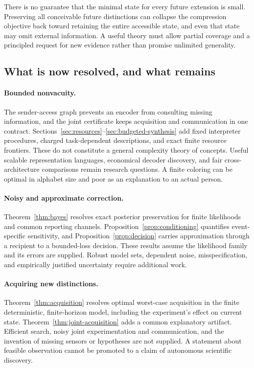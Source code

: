 \documentclass[11pt,letterpaper]{article}
\theoremstyle{plain}
\theoremstyle{definition}
\begin{document}
There is no guarantee that the minimal state for every future extension is small. Preserving all conceivable future distinctions can collapse the compression objective back toward retaining the entire accessible state, and even that state may omit external information. A useful theory must allow partial coverage and a principled request for new evidence rather than promise unlimited generality.

\subsection{What is now resolved, and what remains}
\paragraph{Bounded nonvacuity.}
The sender-access graph prevents an encoder from consulting missing information, and the joint certificate keeps acquisition and communication in one contract. Sections~\ref{sec:resources}--\ref{sec:budgeted-synthesis} add fixed interpreter procedures, charged task-dependent descriptions, and exact finite resource frontiers. These do not constitute a general complexity theory of concepts. Useful scalable representation languages, economical decoder discovery, and fair cross-architecture comparisons remain research questions. A finite coloring can be optimal in alphabet size and poor as an explanation to an actual person.

\paragraph{Noisy and approximate correction.}
Theorem~\ref{thm:bayes} resolves exact posterior preservation for finite likelihoods and common reporting channels. Proposition~\ref{prop:conditioning} quantifies event-specific sensitivity, and Proposition~\ref{prop:decision} carries approximation through a recipient to a bounded-loss decision. These results assume the likelihood family and its errors are supplied. Robust model sets, dependent noise, misspecification, and empirically justified uncertainty require additional work.

\paragraph{Acquiring new distinctions.}
Theorem~\ref{thm:acquisition} resolves optimal worst-case acquisition in the finite deterministic, finite-horizon model, including the experiment's effect on current state. Theorem~\ref{thm:joint-acquisition} adds a common explanatory artifact. Efficient search, noisy joint experimentation and communication, and the invention of missing sensors or hypotheses are not supplied. A statement about feasible observation cannot be promoted to a claim of autonomous scientific discovery.
\end{document}
